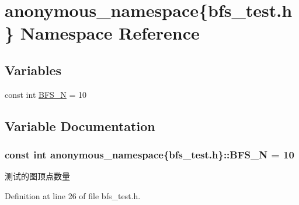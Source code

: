 \hypertarget{namespaceanonymous__namespace_02bfs__test_8h_03}{}\section{anonymous\+\_\+namespace\{bfs\+\_\+test.\+h\} Namespace Reference}
\label{namespaceanonymous__namespace_02bfs__test_8h_03}
\subsection*{Variables}
\begin{DoxyCompactItemize}
\item 
const int \hyperlink{namespaceanonymous__namespace_02bfs__test_8h_03_a7ef7694f8bba52249972564b4086098c}{B\+F\+S\+\_\+\+N} = 10
\end{DoxyCompactItemize}


\subsection{Variable Documentation}
\hypertarget{namespaceanonymous__namespace_02bfs__test_8h_03_a7ef7694f8bba52249972564b4086098c}{}
\subsubsection[{B\+F\+S\+\_\+\+N}]{\setlength{\rightskip}{0pt plus 5cm}const int anonymous\+\_\+namespace\{bfs\+\_\+test.\+h\}\+::B\+F\+S\+\_\+\+N = 10}\label{namespaceanonymous__namespace_02bfs__test_8h_03_a7ef7694f8bba52249972564b4086098c}
测试的图顶点数量 

Definition at line 26 of file bfs\+\_\+test.\+h.

